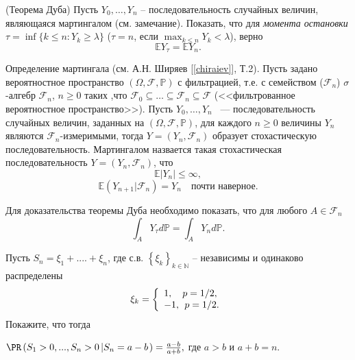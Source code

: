 \begin{problem}\Star(Теорема Дуба)
\label{sec:doob}
Пусть $Y_0,\dots,Y_n$ -- последовательность случайных величин, являющаяся мартингалом (см. замечание).
Показать, что для  \textit{момента остановки}
$\tau = \inf \{k\leq n: Y_k\geq \lambda \}$  ($\tau = n$, если $\max_{k\leq n}Y_k <\lambda$), верно
\begin{equation*}
\mathbb{E}{Y_{\tau}} = \mathbb{E}Y_n.
\end{equation*}
\end{problem}
\begin{remark}
Определение мартингала (см. А.Н. Ширяев [\ref{chiraiev}], Т.2). Пусть задано вероятностное пространство $(\Omega,\mathcal{F},\mathbb{P})$ с фильтрацией, т.е. с семейством ($\mathcal{F}_n$) $\sigma$-алгебр $\mathcal{F}_n$, $n\geq 0$ таких ,что $\mathcal{F}_0\subseteq\dots\subseteq\mathcal{F}_n\subseteq \mathcal{F}$ (<<фильтрованное вероятностное пространство>>). 
Пусть $Y_0,\dots,Y_n$ ~--- последовательность случайных величин, заданных на $(\Omega,\mathcal{F},\mathbb{P})$, для каждого $n\geq 0 $ величины $Y_n$ являются $\mathcal{F}_n$-измеримыми, тогда $Y = (Y_n,\mathcal{F}_n)$ образует стохастическую последовательность. Мартингалом назвается  такая стохастическая последовательность $Y = (Y_n,\mathcal{F}_n)$, что 
\begin{equation*}
\mathbb{E}|Y_n|\leq\infty,
\end{equation*}
\begin{equation*}
\mathbb{E}(Y_{n+1}|\mathcal{F}_n)=Y_n \quad \text{почти наверное}.
\end{equation*}

Для доказательства теоремы Дуба необходимо показать, что 
 для любого $A\in \mathcal{F}_n$ 
\begin{equation*}
\int_{A} Y_{\tau} d\mathbb{P} = \int_{A}Y_{n}d\mathbb{P}.
\end{equation*}
\end{remark}

\begin{problem}
Пусть $S_n =\xi _1 +....+\xi _n $, где с.в. $\left\{ {\xi _k } \right\}_{k\in {\mathbb N}} $ -- 
независимы и одинаково распределены \[\xi _k =\left\{ {\begin{array}{l}
 1,\quad p=1 \mathord{\left/ {\vphantom {1 2}} \right. 
\kern-\nulldelimiterspace} 2, \\ 
 -1,\;\,p=1 \mathord{\left/ {\vphantom {1 2}} \right. 
\kern-\nulldelimiterspace} 2. \\ 
 \end{array}} \right.\] Покажите, что тогда

$\PR\left( {S_1 >0,...,S_n >0\left| {S_n =a-b} \right.} 
\right)=\frac{a-b}{a+b},$ где $a>b$ и $a+b=n$.
\end{problem}

